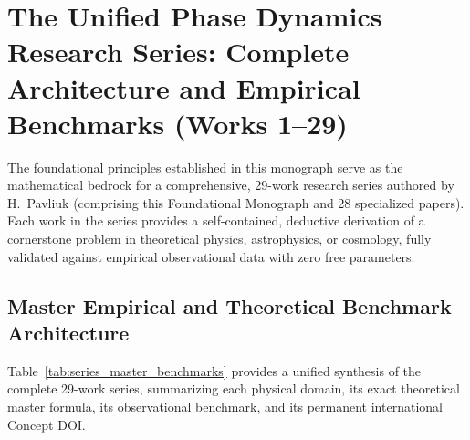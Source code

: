 \documentclass[11pt,a4paper]{article}
\theoremstyle{definition}
\begin{document}
\section{The Unified Phase Dynamics Research Series: Complete Architecture and Empirical Benchmarks (Works 1--29)}
\label{sec:series_synthesis}

The foundational principles established in this monograph serve as the mathematical bedrock for a comprehensive, 29-work research series authored by H.~Pavliuk (comprising this Foundational Monograph and 28 specialized papers). Each work in the series provides a self-contained, deductive derivation of a cornerstone problem in theoretical physics, astrophysics, or cosmology, fully validated against empirical observational data with zero free parameters.

\subsection{Master Empirical and Theoretical Benchmark Architecture}

Table~\ref{tab:series_master_benchmarks} provides a unified synthesis of the complete 29-work series, summarizing each physical domain, its exact theoretical master formula, its observational benchmark, and its permanent international Concept DOI.
\end{document}
